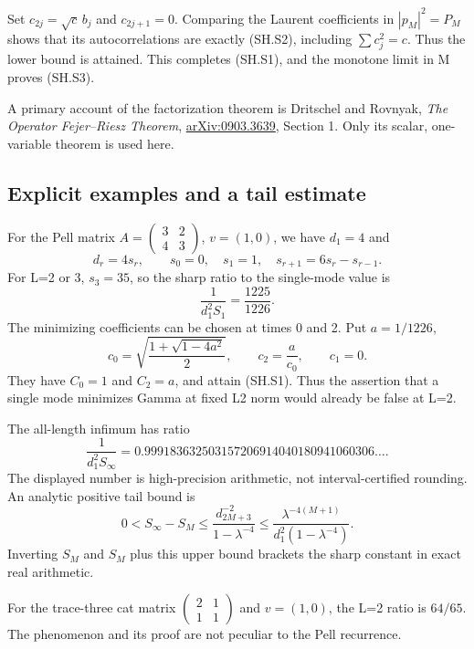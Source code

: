 Set \(c_{2j}=\sqrt c\,b_j\) and \(c_{2j+1}=0\). Comparing the Laurent coefficients in \(|p_M|^2=P_M\) shows that its autocorrelations are exactly (SH.S2), including \(\sum c_j^2=c\). Thus the lower bound is attained. This completes (SH.S1), and the monotone limit in M proves (SH.S3).

A primary account of the factorization theorem is Dritschel and Rovnyak, \emph{The Operator Fejer--Riesz Theorem}, \href{https://arxiv.org/abs/0903.3639}{arXiv:0903.3639}, Section 1. Only its scalar, one-variable theorem is used here.

\subsection{Explicit examples and a tail estimate}\label{sharp:explicit-examples-and-a-tail-estimate}

For the Pell matrix \(A=\left(\begin{smallmatrix}3&2\\4&3\end{smallmatrix}\right)\), \(v=(1,0)\), we have \(d_1=4\) and \[
 d_r=4s_r,\qquad s_0=0,\quad s_1=1,\quad s_{r+1}=6s_r-s_{r-1}.
\] For L=2 or 3, \(s_3=35\), so the sharp ratio to the single-mode value is \[
       \frac{1}{d_1^2S_1}=\frac{1225}{1226}.                 \tag{SH.S7}
\] The minimizing coefficients can be chosen at times 0 and 2. Put \(a=1/1226\), \[
 c_0=\sqrt{\frac{1+\sqrt{1-4a^2}}{2}},\qquad
 c_2=\frac a{c_0},\qquad c_1=0.
\] They have \(C_0=1\) and \(C_2=a\), and attain (SH.S1). Thus the assertion that a single mode minimizes Gamma at fixed L2 norm would already be false at L=2.

The all-length infimum has ratio \[
 \frac{1}{d_1^2S_\infty}
  =0.999183632503157206914040180941060306\ldots .             \tag{SH.S8}
\] The displayed number is high-precision arithmetic, not interval-certified rounding. An analytic positive tail bound is \[
 0<S_\infty-S_M
   \leq \frac{d_{2M+3}^{-2}}{1-\lambda^{-4}}
   \leq\frac{\lambda^{-4(M+1)}}{d_1^2(1-\lambda^{-4})}.       \tag{SH.S9}
\] Inverting \(S_M\) and \(S_M\) plus this upper bound brackets the sharp constant in exact real arithmetic.

For the trace-three cat matrix \(\left(\begin{smallmatrix}2&1\\1&1\end{smallmatrix}\right)\) and \(v=(1,0)\), the L=2 ratio is \(64/65\). The phenomenon and its proof are not peculiar to the Pell recurrence.
